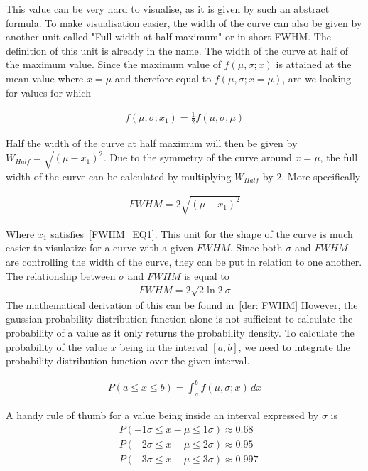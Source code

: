 \documentclass[reprint,english,notitlepage]{revtex4-2}
\begin{document}
This value can be very hard to visualise, as it is given by such an abstract formula.
To make visualisation easier, the width of the curve can also be given by another unit called "Full width at half maximum" or in short FWHM.
The definition of this unit is already in the name. The width of the curve at half of the maximum value.
Since the maximum value of $f(\mu, \sigma; x)$ is attained at the mean value where $x=\mu$ and therefore equal to $f(\mu, \sigma; x=\mu)$, are we looking for values for which

\begin{align}
    f(\mu, \sigma; x_1) = \frac{1}{2} f(\mu, \sigma, \mu) \label{FWHM_EQ1}
\end{align}

Half the width of the curve at half maximum will then be given by $W_{Half} = \sqrt{(\mu - x_1)^2}$.
Due to the symmetry of the curve around $x =\mu$, the full width of the curve can be calculated by multiplying $W_{Half}$ by $2$.
More specifically

\begin{align*}
    FWHM = 2\sqrt{(\mu - x_1)^2}
\end{align*}

Where $x_1$ satisfies~\ref{FWHM_EQ1}. This unit for the shape of the curve is much easier to visulatize for a curve with a given $FWHM$.
Since both $\sigma$ and $FWHM$ are controlling the width of the curve, they can be put in relation to one another.
The relationship between $\sigma$ and $FWHM$ is equal to
\begin{align*}
    FWHM = 2\sqrt{2\ln2}\sigma
\end{align*}
The mathematical derivation of this can be found in~\ref{der: FWHM}
However, the gaussian probability distribution function alone is not sufficient to calculate the probability of a value as it only returns the probability density.
To calculate the probability of the value $x$ being in the interval $[a, b]$, we need to integrate the probability distribution function over the given interval.

\begin{align*}
    P(a ≤ x ≤ b) = \int_{a}^{b} f(\mu, \sigma; x) \, dx
\end{align*}

A handy rule of thumb for a value being inside an interval expressed by $\sigma$ is
\begin{align*}
    &P(-1\sigma ≤ x-\mu ≤ 1\sigma) ≈ 0.68\\
	&P(-2\sigma ≤ x-\mu ≤ 2\sigma) ≈ 0.95\\
	&P(-3\sigma ≤ x-\mu ≤ 3\sigma) ≈ 0.997
\end{align*}
\end{document}
